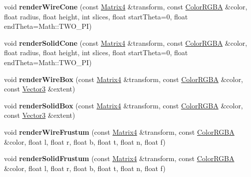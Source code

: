 \begin{DoxyCompactItemize}
\item 
void {\bfseries render\+Wire\+Cone} (const \hyperlink{class_magnum_1_1_matrix4}{Matrix4} \&transform, const \hyperlink{class_magnum_1_1_color_r_g_b_a}{Color\+R\+G\+BA} \&color, float radius, float height, int slices, float start\+Theta=0, float end\+Theta=Math\+::\+T\+W\+O\+\_\+\+PI)\hypertarget{class_magnum_1_1_i_component_debug_renderer_aabe06931f3b3d1b1bf1d0e996ab6fb4d}{}\label{class_magnum_1_1_i_component_debug_renderer_aabe06931f3b3d1b1bf1d0e996ab6fb4d}

\item 
void {\bfseries render\+Solid\+Cone} (const \hyperlink{class_magnum_1_1_matrix4}{Matrix4} \&transform, const \hyperlink{class_magnum_1_1_color_r_g_b_a}{Color\+R\+G\+BA} \&color, float radius, float height, int slices, float start\+Theta=0, float end\+Theta=Math\+::\+T\+W\+O\+\_\+\+PI)\hypertarget{class_magnum_1_1_i_component_debug_renderer_abeda76c526fa336f290520d318a0eb31}{}\label{class_magnum_1_1_i_component_debug_renderer_abeda76c526fa336f290520d318a0eb31}

\item 
void {\bfseries render\+Wire\+Box} (const \hyperlink{class_magnum_1_1_matrix4}{Matrix4} \&transform, const \hyperlink{class_magnum_1_1_color_r_g_b_a}{Color\+R\+G\+BA} \&color, const \hyperlink{class_magnum_1_1_vector3}{Vector3} \&extent)\hypertarget{class_magnum_1_1_i_component_debug_renderer_abaf3f7219bd34c0f075c509a71143f40}{}\label{class_magnum_1_1_i_component_debug_renderer_abaf3f7219bd34c0f075c509a71143f40}

\item 
void {\bfseries render\+Solid\+Box} (const \hyperlink{class_magnum_1_1_matrix4}{Matrix4} \&transform, const \hyperlink{class_magnum_1_1_color_r_g_b_a}{Color\+R\+G\+BA} \&color, const \hyperlink{class_magnum_1_1_vector3}{Vector3} \&extent)\hypertarget{class_magnum_1_1_i_component_debug_renderer_a435d94b22bc31890a9c88a8efabee245}{}\label{class_magnum_1_1_i_component_debug_renderer_a435d94b22bc31890a9c88a8efabee245}

\item 
void {\bfseries render\+Wire\+Frustum} (const \hyperlink{class_magnum_1_1_matrix4}{Matrix4} \&transform, const \hyperlink{class_magnum_1_1_color_r_g_b_a}{Color\+R\+G\+BA} \&color, float l, float r, float b, float t, float n, float f)\hypertarget{class_magnum_1_1_i_component_debug_renderer_a2dd362fd9082054572fd3e562e251582}{}\label{class_magnum_1_1_i_component_debug_renderer_a2dd362fd9082054572fd3e562e251582}

\item 
void {\bfseries render\+Solid\+Frustum} (const \hyperlink{class_magnum_1_1_matrix4}{Matrix4} \&transform, const \hyperlink{class_magnum_1_1_color_r_g_b_a}{Color\+R\+G\+BA} \&color, float l, float r, float b, float t, float n, float f)\hypertarget{class_magnum_1_1_i_component_debug_renderer_ac08a39573a0b7f8a29d526476d6fe4b5}{}\label{class_magnum_1_1_i_component_debug_renderer_ac08a39573a0b7f8a29d526476d6fe4b5}

\end{DoxyCompactItemize}
